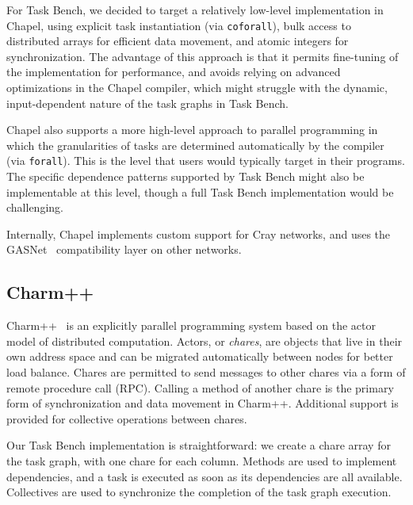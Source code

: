 For Task Bench, we decided to target a relatively low-level
implementation in Chapel, using explicit task instantiation (via
\lstinline[language=Chapel]{coforall}), bulk access to distributed
arrays for efficient data movement, and atomic integers for
synchronization. The advantage of this approach is that it permits
fine-tuning of the implementation for performance, and avoids relying
on advanced optimizations in the Chapel compiler, which might struggle
with the dynamic, input-dependent nature of the task graphs in Task
Bench.

Chapel also supports a more high-level approach to parallel
programming in which the granularities of tasks are determined
automatically by the compiler (via
\lstinline[language=Chapel]{forall}). This is the level that users
would typically target in their programs. The specific dependence
patterns supported by Task Bench might also be implementable at this
level, though a full Task Bench implementation would be challenging.


Internally, Chapel implements custom support for Cray networks, and
uses the GASNet~\cite{GASNET07} compatibility layer on other networks.

\subsection{Charm++}

Charm++~\cite{Charmpp93} is an explicitly parallel programming system
based on the actor model of distributed computation. Actors, or
\emph{chares}, are objects that live in their own address space and
can be migrated automatically between nodes for better load
balance. Chares are permitted to send messages to other chares via a
form of remote procedure call (RPC). Calling a method of another chare
is the primary form of synchronization and data movement in
Charm++. Additional support is provided for collective operations
between chares.

Our Task Bench implementation is straightforward: we create a chare
array for the task graph, with one chare for each column. Methods are
used to implement dependencies, and a task is executed as soon as its
dependencies are all available. Collectives are used to synchronize the
completion of the task graph execution.


